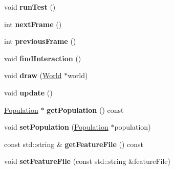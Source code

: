 \begin{DoxyCompactItemize}
\item 
void {\bfseries run\+Test} ()\hypertarget{classPopulationManager_af59d2f1328ae10dd0f39bed9f7fd1446}{}\label{classPopulationManager_af59d2f1328ae10dd0f39bed9f7fd1446}

\item 
int {\bfseries next\+Frame} ()\hypertarget{classPopulationManager_adefe1cf12c8235dcbb1b71c4abaf9285}{}\label{classPopulationManager_adefe1cf12c8235dcbb1b71c4abaf9285}

\item 
int {\bfseries previous\+Frame} ()\hypertarget{classPopulationManager_a3cff6a6092f49e9dc1c1ceab1d8ebd02}{}\label{classPopulationManager_a3cff6a6092f49e9dc1c1ceab1d8ebd02}

\item 
void {\bfseries find\+Interaction} ()\hypertarget{classPopulationManager_a11ccb01d3f63cb74fee26876d6fd353a}{}\label{classPopulationManager_a11ccb01d3f63cb74fee26876d6fd353a}

\item 
void {\bfseries draw} (\hyperlink{classWorld}{World} $\ast$world)\hypertarget{classPopulationManager_a7b61ef70b107a5c6ffa7ae811cb2e9f7}{}\label{classPopulationManager_a7b61ef70b107a5c6ffa7ae811cb2e9f7}

\item 
void {\bfseries update} ()\hypertarget{classPopulationManager_aa6911ed18539c497498a824d94c518fa}{}\label{classPopulationManager_aa6911ed18539c497498a824d94c518fa}

\item 
\hyperlink{classPopulation}{Population} $\ast$ {\bfseries get\+Population} () const \hypertarget{classPopulationManager_a004d5657414384945ccd9ce19e052b6b}{}\label{classPopulationManager_a004d5657414384945ccd9ce19e052b6b}

\item 
void {\bfseries set\+Population} (\hyperlink{classPopulation}{Population} $\ast$population)\hypertarget{classPopulationManager_a8a049f79ebad2ca3b95ca830a2cb4ce4}{}\label{classPopulationManager_a8a049f79ebad2ca3b95ca830a2cb4ce4}

\item 
const std\+::string \& {\bfseries get\+Feature\+File} () const \hypertarget{classPopulationManager_a27684ca0d24e28d03e8101d22665cfc7}{}\label{classPopulationManager_a27684ca0d24e28d03e8101d22665cfc7}

\item 
void {\bfseries set\+Feature\+File} (const std\+::string \&feature\+File)\hypertarget{classPopulationManager_a943ed6b0d245b7a067bae3e3bf8b8a76}{}\label{classPopulationManager_a943ed6b0d245b7a067bae3e3bf8b8a76}


\end{DoxyCompactItemize}
